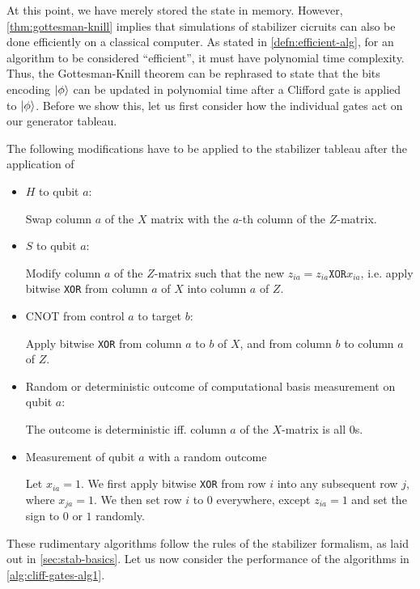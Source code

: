 At this point, we have merely stored the state in memory. However,
\cref{thm:gottesman-knill} implies that simulations of stabilizer cicruits can
also be done efficiently on a classical computer. As stated in
\cref{defn:efficient-alg}, for an algorithm to be
considered \enquote{efficient}, it must have polynomial time complexity.
Thus, the Gottesman-Knill theorem can be rephrased to state that the bits encoding
$\ket{\phi}$ can be updated in polynomial time after a Clifford gate is
applied to $\ket{\phi}$. Before we show this, let us first consider how the individual
gates act on our generator tableau. 
\begin{alg}\label{alg:cliff-gates-alg1}
  The following modifications have to be applied to the stabilizer tableau
  after the application of
  \begin{itemize}
    \item $H$ to qubit $a$:

      Swap column $a$ of the $X$ matrix with the $a$-th column of the
      $Z$-matrix.
    \item $S$ to qubit $a$:

      Modify column $a$ of the $Z$-matrix such that the
      new $z_{ia} = z_{ia} \texttt{XOR} x_{ia}$, i.e. apply bitwise
      \texttt{XOR} from column $a$ of $X$ into column $a$ of $Z$.
    \item CNOT from control $a$ to target $b$:
     
      Apply bitwise \texttt{XOR} from
      column $a$ to $b$ of $X$, and from column $b$ to column $a$ of $Z$.
    \item Random or deterministic outcome of computational basis measurement on
      qubit $a$:

      The outcome is deterministic iff. column $a$ of the $X$-matrix is all 0s.
    \item Measurement of qubit $a$ with a random outcome

      Let $x_{ia}=1$. We first apply bitwise \texttt{XOR} from row $i$ into any
      subsequent row $j$, where $x_{ja}=1$. We then set row $i$ to $0$
      everywhere, except $z_{ia}=1$ and set the sign to $0$ or $1$ randomly.
  \end{itemize}
\end{alg}
These rudimentary algorithms follow the rules of the stabilizer formalism, as
laid out in \cref{sec:stab-basics}. Let us now consider the performance of
the algorithms in \cref{alg:cliff-gates-alg1}.

